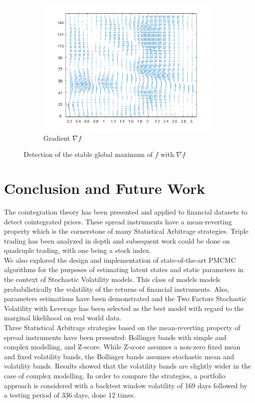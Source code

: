 \documentclass[11pt,a4,twosided,singlespacing,titlepagenumber=on]{scrreprt}
\numberwithin{equation}{chapter} %
\theoremstyle{remark}
\begin{document}
\begin{figure}[H]
\begin{subfigure}[t]{0.32\textwidth}
        \includegraphics[width=1\textwidth]{surf/3}
        \caption{Gradient $\nabla f$}
        \label{vol_mod_sma}
    \end{subfigure}
    \caption{Detection of the stable global maximum of $f$ with $\nabla f$}
    \label{fig:sharpe_ratio_topology}
\end{figure}

\chapter{Conclusion and Future Work}

The cointegration theory has been presented and applied to financial datasets to detect cointegrated prices. These spread instruments have a mean-reverting property which is the cornerstone of many Statistical Arbitrage strategies. Triple trading has been analyzed in depth and subsequent work could be done on quadruple trading, with one being a stock index. \\

We also explored the design and implementation of state-of-the-art PMCMC algorithms for the purposes of estimating latent states and static parameters in the context of Stochastic Volatility models. This class of models models probabilistically the volatility of the returns of financial instruments. Also, parameters estimations have been demonstrated and the Two Factors Stochastic Volatility with Leverage has been selected as the best model with regard to the marginal likelihood on real world data.\\

Three Statistical Arbitrage strategies based on the mean-reverting property of spread instruments have been presented: Bollinger bands with simple and complex modelling, and Z-score. While Z-score assumes a non-zero fixed mean and fixed volatility bands, the Bollinger bands assumes stochastic mean and volatility bands. Results showed that the volatility bands are slightly wider in the case of complex modelling. In order to compare the strategies, a portfolio approach is considered with a backtest window volatility of 169 days followed by a testing period of 336 days, done 12 times. \\
\end{document}

